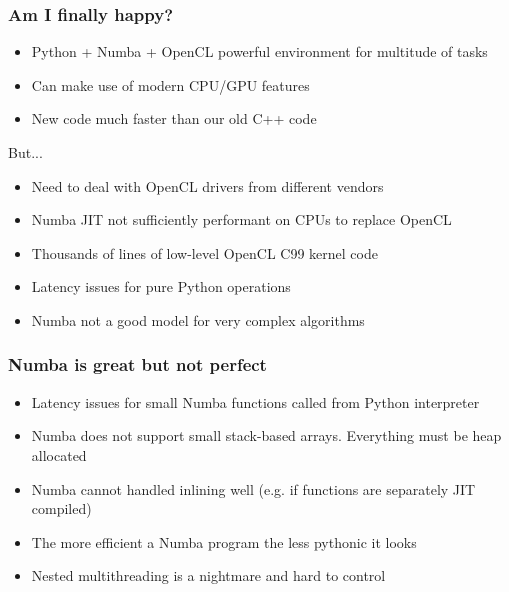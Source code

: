 \documentclass[dvipsnames,10pt]{beamer}
\begin{document}
		
\begin{frame}
	\frametitle{Am I finally happy?}
	
	\begin{itemize}
		\item {\color{blue} Python + Numba + OpenCL powerful environment for multitude of tasks}
		\item {\color{blue} Can make use of modern CPU/GPU features}
		\item {\color{blue} New code much faster than our old C++ code}
	\end{itemize}
	
	\vspace{\baselineskip}
	
	But...
	
	\begin{itemize}
		\item {\color{red} Need to deal with OpenCL drivers from different vendors}
		\item {\color{red} Numba JIT not sufficiently performant on CPUs to replace OpenCL}
		\item {\color{red} Thousands of lines of low-level OpenCL C99 kernel code}
		\item {\color{red} Latency issues for pure Python operations}
		\item {\color{red} Numba not a good model for very complex algorithms}
	\end{itemize}
		
	
\end{frame}

\begin{frame}
	\frametitle{Numba is great but not perfect}
	
	\begin{itemize}
	\item Latency issues for small Numba functions called from Python interpreter
	\item Numba does not support small stack-based arrays. Everything must be heap allocated
	\item Numba cannot handled inlining well (e.g. if functions are separately JIT compiled)
	\item The more efficient a Numba program the less pythonic it looks
	\item Nested multithreading is a nightmare and hard to control
	
	\end{itemize}
	
\end{frame}
\end{document}

